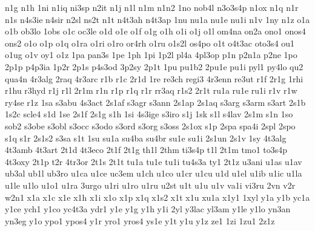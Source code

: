 {n1g
n1h
1ni
n1iq
ni3sp
n2it
n1j
n1l
n1m
n1n2
1no
nob4l
n3o3s4p
n1ox
n1q
n1r
n1s
n4s3ie
n4sir
n2sl
ns2t
n1t
n4t3ah
n4t3ap
1nu
nu1a
nu1e
nu1i
n1v
1ny
n1z
o1a
o1b
ob3lo
1obs
o1c
oc3le
o1d
o1e
o1f
o1g
o1h
o1i
o1j
o1l
om4na
on2a
ono1
onos4
ons2
o1o
o1p
o1q
o1ra
o1ri
o1ro
or4rh
o1ru
o1s2l
os4po
o1t
o4t3ac
oto3s4
ou1
o1ug
o1v
oy1
o1z
1pa
pan3s
1pe
1ph
1pi
1p2l
pl4a
4pl3op
p1n
p2n1a
p2ne
1po
2p1p
p4p3ia
1p2r
2p1s
p4s3od
3p2sy
2p1t
1pu
pu1b2
2pu1e
pu1i
pyl1
py4lo
qu2
qua4n
4r3alg
2raq
4r3arc
r1b
r1c
2r1d
1re
re3ch
regi3
4r3enn
re3ut
r1f
2r1g
1rhi
r1hu
r3hyd
r1j
r1l
2r1m
r1n
r1p
r1q
r1r
rr3aq
r1s2
2r1t
ru1a
ru1e
ru1i
r1v
r1w
ry4se
r1z
1sa
s3abu
4s3act
2s1af
s3agr
s3ann
2s1ap
2s1aq
s3arg
s3arm
s3art
2s1b
1s2c
scle4
s1d
1se
2s1f
2s1g
s1h
1si
4s3ige
s3iro
s1j
1sk
s1l
s4lav
2s1m
s1n
1so
sob2
s3obe
s3obl
s3occ
s3odo
s3ord
s3org
s3oss
2s1ox
s1p
2spa
spa4i
2spl
2spo
s1q
s1r
2s1s2
s3sa
s1t
1su
su1a
su4ba
su4br
su1e
su1i
2s1un
2s1v
1sy
4t3alg
4t3amb
4t3art
2t1d
4t3eco
2t1f
2t1g
th1l
2thm
ti3s4p
t1l
2t1m
tmo1
to3s4p
4t3oxy
2t1p
t2r
4tr3or
2t1s
2t1t
tu1a
tu1e
tu1i
tu4s3a
ty1
2t1z
u3ani
u1as
u1av
ub3al
ub1l
ub3ro
u1ca
u1ce
uc3em
u1ch
u1co
u1cr
u1cu
u1d
u1el
u1ib
u1ic
u1la
u1le
u1lo
u1o1
u1ra
3urgo
u1ri
u1ro
u1ru
u2st
u1t
u1u
u1v
va1i
vi3ru
2vn
v2r
w2n1
x1a
x1c
x1e
x1h
x1i
x1o
x1p
x1q
x1s2
x1t
x1u
xu1a
x1y1
1xyl
y1a
y1b
yc1a
y1ce
ych1
y1co
yc4t3a
ydr1
y1e
y1g
y1h
y1i
2yl
y3lac
yl3am
y1le
y1lo
yn3an
yn3eg
y1o
ypo1
ypos4
y1r
yro1
yros4
ys1e
y1t
y1u
y1z
ze1
1zi
1zu1
2z1z
}
